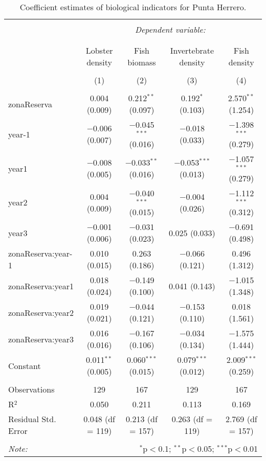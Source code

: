 
\begin{table}[!htbp] \centering 
  \caption{Coefficient estimates of biological indicators for Punta Herrero.} 
  \label{} 
\small 
\begin{tabular}{@{\extracolsep{1pt}}lcccc} 
\\[-1.8ex]\hline 
\hline \\[-1.8ex] 
 & \multicolumn{4}{c}{\textit{Dependent variable:}} \\ 
\cline{2-5} 
\\[-1.8ex] & \multicolumn{4}{c}{} \\ 
 & Lobster density & Fish biomass & Invertebrate density & Fish density \\ 
\\[-1.8ex] & (1) & (2) & (3) & (4)\\ 
\hline \\[-1.8ex] 
 zonaReserva & 0.004 (0.009) & 0.212$^{**}$ (0.097) & 0.192$^{*}$ (0.103) & 2.570$^{**}$ (1.254) \\ 
  year-1 & $-$0.006 (0.007) & $-$0.045$^{***}$ (0.016) & $-$0.018 (0.033) & $-$1.398$^{***}$ (0.279) \\ 
  year1 & $-$0.008 (0.005) & $-$0.033$^{**}$ (0.016) & $-$0.053$^{***}$ (0.013) & $-$1.057$^{***}$ (0.279) \\ 
  year2 & 0.004 (0.009) & $-$0.040$^{***}$ (0.015) & $-$0.004 (0.026) & $-$1.112$^{***}$ (0.312) \\ 
  year3 & $-$0.001 (0.006) & $-$0.031 (0.023) & 0.025 (0.033) & $-$0.691 (0.498) \\ 
  zonaReserva:year-1 & 0.010 (0.015) & 0.263 (0.186) & $-$0.066 (0.121) & 0.496 (1.312) \\ 
  zonaReserva:year1 & 0.018 (0.024) & $-$0.149 (0.100) & 0.041 (0.143) & $-$1.015 (1.348) \\ 
  zonaReserva:year2 & 0.019 (0.021) & $-$0.044 (0.121) & $-$0.153 (0.110) & 0.018 (1.561) \\ 
  zonaReserva:year3 & 0.016 (0.016) & $-$0.167 (0.106) & $-$0.034 (0.134) & $-$1.575 (1.444) \\ 
  Constant & 0.011$^{**}$ (0.005) & 0.060$^{***}$ (0.015) & 0.079$^{***}$ (0.012) & 2.009$^{***}$ (0.259) \\ 
 \hline \\[-1.8ex] 
Observations & 129 & 167 & 129 & 167 \\ 
R$^{2}$ & 0.050 & 0.211 & 0.113 & 0.169 \\ 
Residual Std. Error & 0.048 (df = 119) & 0.213 (df = 157) & 0.263 (df = 119) & 2.769 (df = 157) \\ 
\hline 
\hline \\[-1.8ex] 
\textit{Note:}  & \multicolumn{4}{r}{$^{*}$p$<$0.1; $^{**}$p$<$0.05; $^{***}$p$<$0.01} \\ 
\end{tabular} 
\end{table} 
